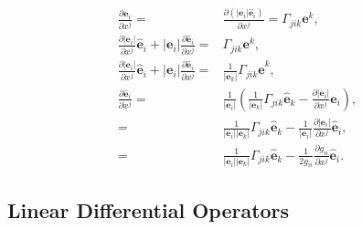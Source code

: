 \documentclass[12pt,twoside,openright]{memoir}
\newcommand{\bm}[1]{\boldsymbol{#1}}
\newcommand{\bfrac}[2]{\displaystyle\frac{#1}{#2}}
\newcommand{\lp}{\left (}
\newcommand{\rp}{\right )}
\newcommand{\abs}[1]{\left |{#1}\right |}
\newcommand{\pdiff}[2]{\bfrac{\partial {#1}}{\partial {#2}}}
\newcommand{\paren}[1]{\lp {#1} \rp}
\begin{document}
\begin{align}
	\pdiff{\bm{e}_{i}}{x^{j}} =& \pdiff{\paren{\abs{\bm{e}_{i}}\bm{\hat{e}}_{i}}}{x^{j}} = \Gamma_{jik}\bm{e}^{k}, \nonumber \\
	\pdiff{\abs{\bm{e}_{i}}}{x^{j}}\bm{\hat{e}}_{i}
							          +\abs{\bm{e}_{i}}\pdiff{\bm{\hat{e}}_{i}}{x^{j}} =&\Gamma_{jik}\bm{e}^{k}, \nonumber \\
	\pdiff{\abs{\bm{e}_{i}}}{x^{j}}\bm{\hat{e}}_{i}
							          +\abs{\bm{e}_{i}}\pdiff{\bm{\hat{e}}_{i}}{x^{j}} =& \bfrac{1}{\abs{\bm{e}_{k}}}\Gamma_{jik}\bm{\hat{e}}^{k}, \nonumber \\
	\pdiff{\bm{\hat{e}}_{i}}{x^{j}} =& \bfrac{1}{\abs{\bm{e}_{i}}}\paren{\bfrac{1}{\abs{\bm{e}_{k}}}\Gamma_{jik}\bm{\hat{e}}_{k}
	                                   -\pdiff{\abs{\bm{e}_{i}}}{x^{j}}\bm{\hat{e}}_{i}}, \nonumber \\
	                                =& \bfrac{1}{\abs{\bm{e}_{i}}\abs{\bm{e}_{k}}}\Gamma_{jik}\bm{\hat{e}}_{k}
	                                   -\bfrac{1}{\abs{\bm{e}_{i}}}\pdiff{\abs{\bm{e}_{i}}}{x^{j}}\bm{\hat{e}}_{i},  \nonumber \\
	                                =& \bfrac{1}{\abs{\bm{e}_{i}}\abs{\bm{e}_{k}}}\Gamma_{jik}\bm{\hat{e}}_{k}
	                                   -\bfrac{1}{2g_{ii}}\pdiff{g_{ii}}{x^{j}}\bm{\hat{e}}_{i}.
\end{align}

\subsection{Linear Differential Operators}\label{ldops}
\end{document}
